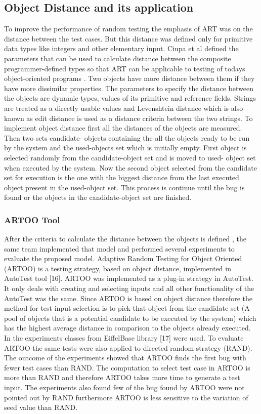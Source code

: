 \subsection{Object Distance and its application}
To improve the performance of random testing the emphasis of ART was on the distance between the test cases. But this distance was defined only for primitive data types like integers and other elementary input. Ciupa et al defined the parameters that can be used to calculate distance between the composite programmer-defined types so that ART can be applicable to testing of todays object-oriented programs \cite{Ciupa2006}. Two objects have more distance between them if they have more dissimilar properties.
The parameters to specify the distance between the objects are dynamic types, values of its primitive and reference fields. Strings are treated as a directly usable values and Levenshtein distance \cite{Levenshtein1966} which is also known as edit distance is used as a distance criteria between the two strings.
To implement object distance first all the distances of the objects are measured. Then two sets candidate- objects containing the all the objects ready to be run by the system and the used-objects set which is initially empty. First object is selected randomly from the candidate-object set and is moved to used- object set when executed by the system. Now the second object selected from the candidate set for execution is the one with the biggest distance from the last executed object present in the used-object set. This process is continue until the bug is found or the objects in the candidate-object set are finished.

\subsubsection{ARTOO Tool}
After the criteria to calculate the distance between the objects is defined \cite{Ciupa2006}, the same team implemented that model and performed several experiments to evaluate the proposed model. Adaptive Random Testing for Object Oriented (ARTOO) is a testing strategy, based on object distance, implemented in AutoTest tool [16].
ARTOO was implemented as a plug-in strategy in AutoTest. It only deals with creating and selecting inputs and all other functionality of the AutoTest was the same. Since ARTOO is based on object distance therefore the method for test input selection is to pick that object from the candidate set (A pool of objects that is a potential candidate to be executed by the system) which has the highest average distance in comparison to the objects already executed.
In the experiments classes from EiffelBase library [17] were used. To evaluate ARTOO the same tests were also applied to directed random strategy (RAND). The outcome of the experiments showed that ARTOO finds the first bug with fewer test cases than RAND. The computation to select test case in ARTOO is more than RAND and therefore ARTOO takes more time to generate a test input. The experiments also found few of the bug found by ARTOO were not pointed out by RAND furthermore ARTOO is less sensitive to the variation of seed value than RAND.

